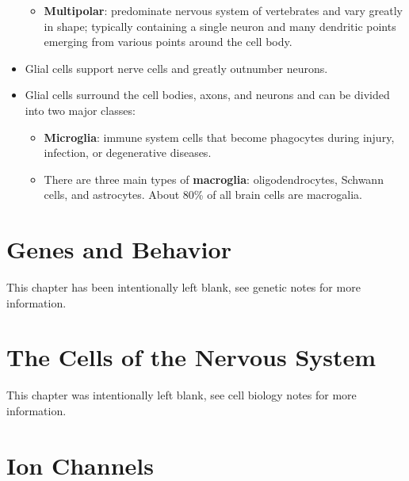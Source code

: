 \documentclass[12pt,a4paper]{article}
\begin{document}
\begin{itemize}
\begin{itemize}
            \item \textbf{Multipolar}: predominate nervous system of vertebrates and vary greatly in shape; typically containing a single neuron and many dendritic points emerging from various points around the cell body.
        \end{itemize}
    \item Glial cells support nerve cells and greatly outnumber neurons. 
    \item Glial cells surround the cell bodies, axons, and neurons and can be divided into two major classes:
        \begin{itemize}
            \item \textbf{Microglia}: immune system cells that become phagocytes during injury, infection, or degenerative diseases. 
            \item There are three main types of \textbf{macroglia}: oligodendrocytes, Schwann cells, and astrocytes. About 80\% of all brain cells are macrogalia.
        \end{itemize}
\end{itemize}

\clearpage
\section{Genes and Behavior}

    This chapter has been intentionally left blank, see genetic notes for more information.

\clearpage
{}
\clearpage
\section{The Cells of the Nervous System}
    This chapter was intentionally left blank, see cell biology notes for more information. 

\clearpage
\section{Ion Channels}
\end{document}
